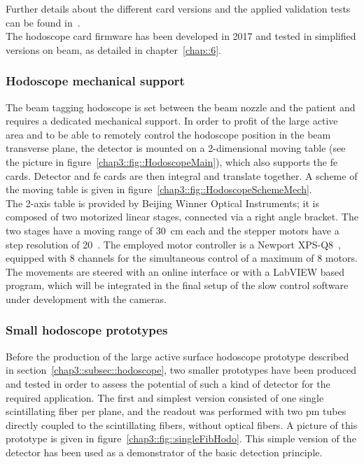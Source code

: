 Further details about the different card versions and the applied validation tests can be found in~\cite{Chen2017}.\\
The hodoscope card firmware has been developed in 2017 and tested in simplified versions on beam, as detailed in chapter~\ref{chap::6}.
           

\subsubsection{Hodoscope mechanical support}\label{chap3::subsubsec::HodoMechanics}

The beam tagging hodoscope is set between the beam nozzle and the patient and requires a dedicated mechanical support. In order to profit of the large active area and to be able to remotely control the hodoscope position in the beam transverse plane, the detector is mounted on a 2-dimensional moving table (see the picture in figure~\ref{chap3::fig::HodoscopeMain}), which also supports the \gls{fe} cards. Detector and \gls{fe} cards are then integral and translate together. A scheme of the moving table is given in figure~\ref{chap3::fig::HodoscopeSchemeMech}.\\
The 2-axis table is provided by Beijing Winner Optical Instruments; it is composed of two motorized linear stages, connected via a right angle bracket. The two stages have a moving range of 30~cm each and the stepper motors have a step resolution of 20~\charmum. The employed motor controller is a Newport XPS-Q8~\parencite{Newport2017}, equipped with 8 channels for the simultaneous control of a maximum of 8 motors. The movements are steered with an online interface or with a LabVIEW based program, which will be integrated in the final setup of the slow control software under development with the cameras.

\subsubsection{Small hodoscope prototypes}\label{chap3::subsubsec::SmallHodoProto}
Before the production of the large active surface hodoscope prototype described in section~\ref{chap3::subsec::hodoscope}, two smaller prototypes have been produced and tested in order to assess the potential of such a kind of detector for the required application. The first and simplest version consisted of one single scintillating fiber per plane, and the readout was performed with two \gls{pm} tubes directly coupled to the scintillating fibers, without optical fibers. A picture of this prototype is given in figure~\ref{chap3::fig::singleFibHodo}. This simple version of the detector has been used as a demonstrator of the basic detection principle.\\ 

